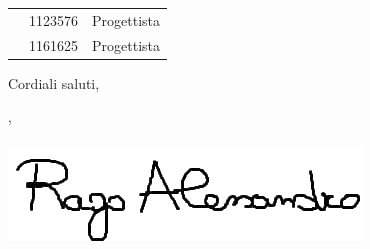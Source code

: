 \documentclass[11pt]{letter}
\begin{document}
\begin{letter}
{\begin{longtable}{ C{4cm} C{4cm} C{4cm}}
                \ZM{} & 1123576 & Progettista\\
                \SP{} & 1161625 & Progettista\\
            \end{longtable}
        }
        Cordiali saluti,
        \begin{flushright}
        	\closing{\RA{}, \\ \textit{\Responsabile{}} \\\includegraphics[width=.6\linewidth]{Utility/Images/firmaRA.png}} 
        \end{flushright}
    \end{letter}
\end{document}
